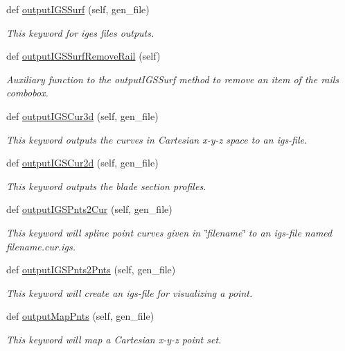 \begin{DoxyCompactItemize}
def \hyperlink{a00070_ada62706610465b6ba0d6fe5070cdbb9c}{output\+I\+G\+S\+Surf} (self, gen\+\_\+file)
\begin{DoxyCompactList}\small\item\em This keyword for iges files outputs. \end{DoxyCompactList}\item 
def \hyperlink{a00070_ae5847a1434bc82a396cebfb20911db56}{output\+I\+G\+S\+Surf\+Remove\+Rail} (self)
\begin{DoxyCompactList}\small\item\em Auxiliary function to the output\+I\+G\+S\+Surf method to remove an item of the rails combobox. \end{DoxyCompactList}\item 
def \hyperlink{a00070_a394d61e8d66fde036f84746086d6c687}{output\+I\+G\+S\+Cur3d} (self, gen\+\_\+file)
\begin{DoxyCompactList}\small\item\em This keyword outputs the curves in Cartesian x-\/y-\/z space to an igs-\/file. \end{DoxyCompactList}\item 
def \hyperlink{a00070_ace84b07ce1416a3535068da6baa2e7d3}{output\+I\+G\+S\+Cur2d} (self, gen\+\_\+file)
\begin{DoxyCompactList}\small\item\em This keyword outputs the blade section profiles. \end{DoxyCompactList}\item 
def \hyperlink{a00070_a60dc6e0ccec5f096ee68f997079abef3}{output\+I\+G\+S\+Pnts2\+Cur} (self, gen\+\_\+file)
\begin{DoxyCompactList}\small\item\em This keyword will spline point curves given in \char`\"{}filename\char`\"{} to an igs-\/file named filename.\+cur.\+igs. \end{DoxyCompactList}\item 
def \hyperlink{a00070_a07862d0aa6332b54008342a24c2e30a3}{output\+I\+G\+S\+Pnts2\+Pnts} (self, gen\+\_\+file)
\begin{DoxyCompactList}\small\item\em This keyword will create an igs-\/file for visualizing a point. \end{DoxyCompactList}\item 
def \hyperlink{a00070_abfeabe3a35852a2ce2ddf16765aef7eb}{output\+Map\+Pnts} (self, gen\+\_\+file)
\begin{DoxyCompactList}\small\item\em This keyword will map a Cartesian x-\/y-\/z point set. \end{DoxyCompactList}\item 

\end{DoxyCompactItemize}
